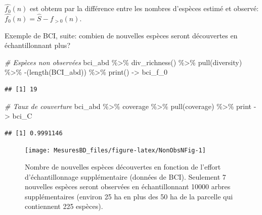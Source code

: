 \documentclass[
  11pt,
  american,
  a4paper,
  extrafontsizes,onecolumn,openright
  ]{memoir}
\newenvironment{Shaded}{\begin{snugshade}}{\end{snugshade}}
\newcommand{\AttributeTok}[1]{\textcolor[rgb]{0.77,0.63,0.00}{#1}}
\newcommand{\CommentTok}[1]{\textcolor[rgb]{0.56,0.35,0.01}{\textit{#1}}}
\newcommand{\FunctionTok}[1]{\textcolor[rgb]{0.00,0.00,0.00}{#1}}
\newcommand{\NormalTok}[1]{#1}
\newcommand{\OtherTok}[1]{\textcolor[rgb]{0.56,0.35,0.01}{#1}}
\newcommand{\SpecialCharTok}[1]{\textcolor[rgb]{0.00,0.00,0.00}{#1}}
\newcommand{\StringTok}[1]{\textcolor[rgb]{0.31,0.60,0.02}{#1}}
\begin{document}
\(\hat{f_0}(n)\) est obtenu par la différence entre les nombres d'espèces estimé et observé: \(\hat{f_0}(n) = \hat{S} - f_{>0}(n)\).

Exemple de BCI, suite: combien de nouvelles espèces seront découvertes en échantillonnant plus?

\scriptsize

\begin{Shaded}
\begin{Highlighting}[]
\CommentTok{\# Espèces non observées}
\NormalTok{bci\_abd }\SpecialCharTok{\%\textgreater{}\%} 
  \FunctionTok{div\_richness}\NormalTok{() }\SpecialCharTok{\%\textgreater{}\%} 
  \FunctionTok{pull}\NormalTok{(diversity) }\SpecialCharTok{\%\textgreater{}\%} 
  \StringTok{\textasciigrave{}}\AttributeTok{{-}}\StringTok{\textasciigrave{}}\NormalTok{(}\FunctionTok{length}\NormalTok{(BCI\_abd)) }\SpecialCharTok{\%\textgreater{}\%} 
  \FunctionTok{print}\NormalTok{() }\OtherTok{{-}\textgreater{}}
\NormalTok{  bci\_f\_0}
\end{Highlighting}
\end{Shaded}

\begin{verbatim}
## [1] 19
\end{verbatim}

\begin{Shaded}
\begin{Highlighting}[]
\CommentTok{\# Taux de couverture}
\NormalTok{bci\_abd }\SpecialCharTok{\%\textgreater{}\%} 
\NormalTok{  coverage }\SpecialCharTok{\%\textgreater{}\%} 
  \FunctionTok{pull}\NormalTok{(coverage) }\SpecialCharTok{\%\textgreater{}\%} 
\NormalTok{  print }\OtherTok{{-}\textgreater{}} 
\NormalTok{  bci\_C}
\end{Highlighting}
\end{Shaded}

\begin{verbatim}
## [1] 0.9991146
\end{verbatim}

\normalsize



\scriptsize

\begin{figure}

{\centering \texttt{[image: MesuresBD\_files/figure-latex/NonObsNFig-1]} 

}

\caption{Nombre de nouvelles espèces découvertes en fonction de l'effort d'échantillonnage supplémentaire (données de BCI). Seulement 7 nouvelles espèces seront observées en échantillonnant 10000 arbres supplémentaires (environ 25 ha en plus des 50 ha de la parcelle qui contiennent 225 espèces).}\label{fig:NonObsNFig}
\end{figure}
\end{document}
